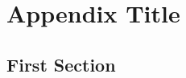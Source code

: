 \documentclass[../manual.tex]{subfiles}
\begin{document}
\chapter{Appendix Title}
\label{app:slug}


\section{First Section}
\label{sec:app_slug_first}

\end{document}
